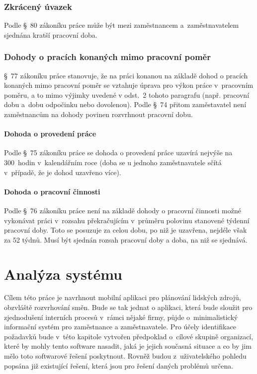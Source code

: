\documentclass[twoside]{ctuthesis}
\begin{document}
\subsection{Zkrácený úvazek}
Podle §~80 zákoníku práce může být mezi zaměstnancem a~zaměstnavatelem sjednána kratší pracovní doba.

\subsection{Dohody o pracích konaných mimo pracovní poměr}
§~77 zákoníku práce stanovuje, že na práci konanou na základě dohod o pracích konaných mimo pracovní poměr se vztahuje úprava pro výkon práce v~pracovním poměru, a to mimo výjimky uvedené v odst.~2 tohoto paragrafu (např. pracovní dobu a~dobu odpočinku nebo dovolenou). Podle §~74 přitom zaměstavatel není zaměstnancům na dohody povinen rozvrhnout pracovní dobu.

\subsubsection{Dohoda o provedení práce}
Podle §~75 zákoníku práce se dohoda o provedení práce uzavírá nejvýše na 300~hodin v~kalendářním roce (doba se u jednoho zaměstnavatele sčítá v~případě, že je dohod uzavřeno více).

\subsubsection{Dohoda o pracovní činnosti}
Podle §~76 zákoníku práce není na základě dohody o pracovní činnosti možné vykonávat práci v~rozsahu překračujícím v~průměru polovinu stanovené týdenní pracovní doby. Toto se posuzuje za celou dobu, po niž je uzavřena, nejdéle však za 52 týdnů. Musí být sjednán rozsah pracovní doby a doba, na niž se sjednává.


\chapter{Analýza systému}

Cílem této práce je navrhnout mobilní aplikaci pro plánování lidských zdrojů, obzvláště rozvrhování směn. Bude se tak jednat o aplikaci, která bude sloužit pro zjednodušení interních procesů v~rámci nějaké firmy, půjde o~minimalistický informační systém pro zaměstnance a zaměstnavatele. Pro účely identifikace požadavků bude v~této kapitole vytvořen předpoklad o~cílové skupině organizací, které by mohly tento software nasadit, jaká je jejich současná situace a co by jim mělo toto softwarové řešení poskytnout. Rovněž budou z~uživatelského pohledu popsána již existující řešení, která jsou pro řešení daných problémů určena.
\end{document}
